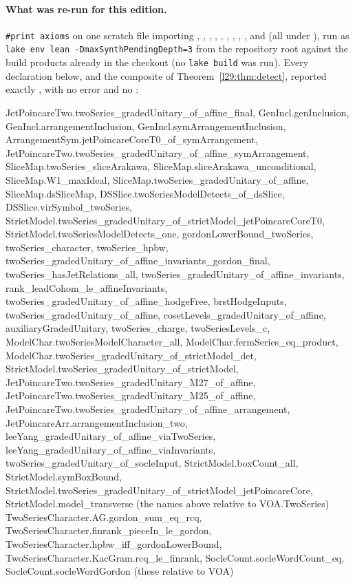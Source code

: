 \paragraph{What was re-run for this edition.} \texttt{\#print axioms} on one scratch file importing
, , , ,
, , , ,
,  and  (all under ), run as
\texttt{lake env lean -DmaxSynthPendingDepth=3} from the repository root against the build products already in the checkout (no
\texttt{lake build} was run). Every declaration below, and the composite  of Theorem~\ref{l29:thm:detect}, reported
exactly , with no error and no :
\begin{plaincode}
JetPoincareTwo.twoSeries_gradedUnitary_of_affine_final, GenIncl.genInclusion,
GenIncl.arrangementInclusion, GenIncl.symArrangementInclusion,
ArrangementSym.jetPoincareCoreT0_of_symArrangement,
JetPoincareTwo.twoSeries_gradedUnitary_of_affine_symArrangement,
SliceMap.twoSeries_sliceArakawa, SliceMap.sliceArakawa_unconditional, SliceMap.W1_maxIdeal,
SliceMap.twoSeries_gradedUnitary_of_affine, SliceMap.dsSliceMap,
DSSlice.twoSeriesModelDetects_of_dsSlice, DSSlice.virSymbol_twoSeries,
StrictModel.twoSeries_gradedUnitary_of_strictModel_jetPoincareCoreT0,
StrictModel.twoSeriesModelDetects_one, gordonLowerBound_twoSeries, twoSeries_character,
twoSeries_hpbw, twoSeries_gradedUnitary_of_affine_invariants_gordon_final,
twoSeries_hasJetRelations_all, twoSeries_gradedUnitary_of_affine_invariants,
rank_leadCohom_le_affineInvariants, twoSeries_gradedUnitary_of_affine_hodgeFree,
brstHodgeInputs, twoSeries_gradedUnitary_of_affine, cosetLevels_gradedUnitary_of_affine,
auxiliaryGradedUnitary, twoSeries_charge, twoSeriesLevels_c,
ModelChar.twoSeriesModelCharacter_all, ModelChar.fermSeries_eq_product,
ModelChar.twoSeries_gradedUnitary_of_strictModel_det,
StrictModel.twoSeries_gradedUnitary_of_strictModel,
JetPoincareTwo.twoSeries_gradedUnitary_M27_of_affine,
JetPoincareTwo.twoSeries_gradedUnitary_M25_of_affine,
JetPoincareTwo.twoSeries_gradedUnitary_of_affine_arrangement,
JetPoincareArr.arrangementInclusion_two, leeYang_gradedUnitary_of_affine_viaTwoSeries,
leeYang_gradedUnitary_of_affine_viaInvariants, twoSeries_gradedUnitary_of_socleInput,
StrictModel.boxCount_all, StrictModel.symBoxBound,
StrictModel.twoSeries_gradedUnitary_of_strictModel_jetPoincareCore,
StrictModel.model_transverse
  (the names above relative to VOA.TwoSeries)
TwoSeriesCharacter.AG.gordon_sum_eq_rcq, TwoSeriesCharacter.finrank_pieceIn_le_gordon,
TwoSeriesCharacter.hpbw_iff_gordonLowerBound, TwoSeriesCharacter.KacGram.rcq_le_finrank,
SocleCount.socleWordCount_eq, SocleCount.socleWordGordon
  (these relative to VOA)
\end{plaincode}
